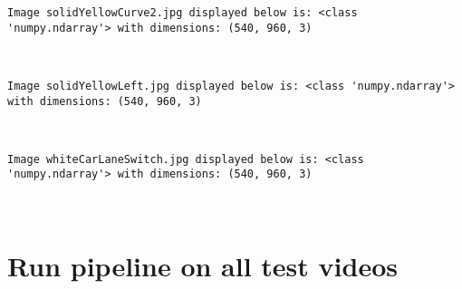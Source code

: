 \documentclass[11pt]{article}
\begin{document}
    \begin{Verbatim}[commandchars=\\\{\}]
Image solidYellowCurve2.jpg displayed below is: <class 'numpy.ndarray'> with dimensions: (540, 960, 3)

    \end{Verbatim}

    \begin{center}
    \end{center}
    { \hspace*{\fill} \\}
    
    \begin{Verbatim}[commandchars=\\\{\}]
Image solidYellowLeft.jpg displayed below is: <class 'numpy.ndarray'> with dimensions: (540, 960, 3)

    \end{Verbatim}

    \begin{center}
    \end{center}
    { \hspace*{\fill} \\}
    
    \begin{Verbatim}[commandchars=\\\{\}]
Image whiteCarLaneSwitch.jpg displayed below is: <class 'numpy.ndarray'> with dimensions: (540, 960, 3)

    \end{Verbatim}

    \begin{center}
    \end{center}
    { \hspace*{\fill} \\}
    
    \hypertarget{run-pipeline-on-all-test-videos}{%
\section{Run pipeline on all test
videos}\label{run-pipeline-on-all-test-videos}}
\end{document}
